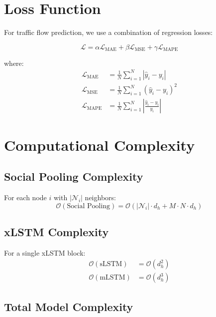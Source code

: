 \documentclass[11pt,a4paper]{article}
\begin{document}
\section{Loss Function}

For traffic flow prediction, we use a combination of regression losses:

\begin{equation}
\mathcal{L} = \alpha \mathcal{L}_{\text{MAE}} + \beta \mathcal{L}_{\text{MSE}} + \gamma \mathcal{L}_{\text{MAPE}}
\end{equation}

where:
\begin{align}
\mathcal{L}_{\text{MAE}} &= \frac{1}{N} \sum_{i=1}^N |\hat{y}_i - y_i| \\
\mathcal{L}_{\text{MSE}} &= \frac{1}{N} \sum_{i=1}^N (\hat{y}_i - y_i)^2 \\
\mathcal{L}_{\text{MAPE}} &= \frac{1}{N} \sum_{i=1}^N \left|\frac{\hat{y}_i - y_i}{y_i}\right|
\end{align}

\section{Computational Complexity}

\subsection{Social Pooling Complexity}

For each node $i$ with $|\mathcal{N}_i|$ neighbors:
\begin{equation}
\mathcal{O}(\text{Social Pooling}) = \mathcal{O}(|\mathcal{N}_i| \cdot d_h + M \cdot N \cdot d_h)
\end{equation}

\subsection{xLSTM Complexity}

For a single xLSTM block:
\begin{align}
\mathcal{O}(\text{sLSTM}) &= \mathcal{O}(d_h^2) \\
\mathcal{O}(\text{mLSTM}) &= \mathcal{O}(d_h^3)
\end{align}

\subsection{Total Model Complexity}
\end{document}

